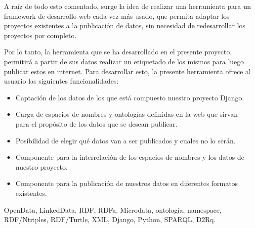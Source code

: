 \noindent A raíz de todo esto comentado, surge la idea de realizar una
herramienta para un framework de desarrollo web cada vez más usado, que permita
adaptar los proyectos existentes a la publicación de datos, sin necesidad de
redesarrollar los proyectos por completo.

\noindent Por lo tanto, la herramienta que se ha desarrollado en el presente
proyecto, permitirá a partir de sus datos realizar un etiquetado de los mismos
para luego publicar estos en internet. Para desarrollar esto, la presente
herramienta ofrece al usuario las siguientes funcionalidades:
\begin{itemize}
    \item Captación de los datos de los que está compuesto nuestro proyecto
        Django.
    \item Carga de espacios de nombres y ontologías definidas en la web que
        sirvan para el propósito de los datos que se desean publicar.
    \item Posibilidad de elegir qué datos van a ser publicados y cuales no lo
        serán.
    \item Componente para la interrelación de los espacios de nombres y los datos de nuestro proyecto.
    \item Componente para la publicación de nuestros datos en diferentes
        formatos existentes.
\end{itemize}

 OpenData, LinkedData, RDF, RDFa, Microdata,
ontología, namespace, \mbox{RDF/Ntriples}, RDF/Turtle, XML, Django, Python, SPARQL,
D2Rq.
